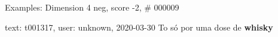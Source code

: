\begin{frame}{Examples: Dimension 4 neg, score -2, \# 000009}
\footnotesize
\begin{alertblock}{text: t001317, user: unknown, 2020-03-30}
To só por uma dose de \textbf{whisky} \textbf{} 
\end{alertblock}
\end{frame}
